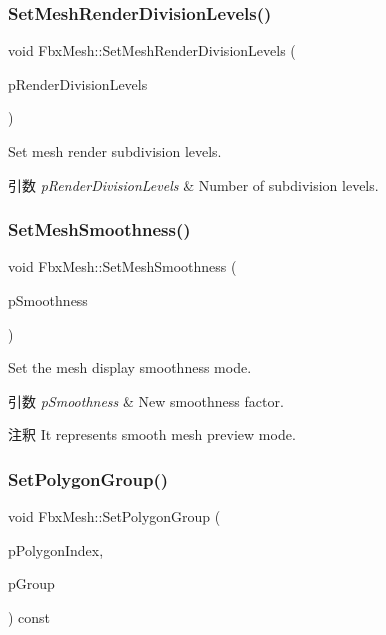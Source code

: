 \subsubsection{\texorpdfstring{Set\+Mesh\+Render\+Division\+Levels()}{SetMeshRenderDivisionLevels()}}
{\footnotesize\ttfamily void Fbx\+Mesh\+::\+Set\+Mesh\+Render\+Division\+Levels (\begin{DoxyParamCaption}\item[{int}]{p\+Render\+Division\+Levels }\end{DoxyParamCaption})}

Set mesh render subdivision levels. 
\begin{DoxyParams}{引数}
{\em p\+Render\+Division\+Levels} & Number of subdivision levels. \\
\hline
\end{DoxyParams}
\mbox{\label{class_fbx_mesh_ab07446f1c0dd0bae4597bb20a9d27265}} 
\subsubsection{\texorpdfstring{Set\+Mesh\+Smoothness()}{SetMeshSmoothness()}}
{\footnotesize\ttfamily void Fbx\+Mesh\+::\+Set\+Mesh\+Smoothness (\begin{DoxyParamCaption}\item[{\hyperlink{class_fbx_mesh_a7ac812140810290f718863c170279cf3}{Fbx\+Mesh\+::\+E\+Smoothness}}]{p\+Smoothness }\end{DoxyParamCaption})}

Set the mesh display smoothness mode. 
\begin{DoxyParams}{引数}
{\em p\+Smoothness} & New smoothness factor. \\
\hline
\end{DoxyParams}
\begin{DoxyRemark}{注釈}
It represents smooth mesh preview mode. 
\end{DoxyRemark}
\mbox{\label{class_fbx_mesh_ab7c7d2325c2afa2c7bd0099b9a0f24dc}} 
\subsubsection{\texorpdfstring{Set\+Polygon\+Group()}{SetPolygonGroup()}}
{\footnotesize\ttfamily void Fbx\+Mesh\+::\+Set\+Polygon\+Group (\begin{DoxyParamCaption}\item[{int}]{p\+Polygon\+Index,  }\item[{int}]{p\+Group }\end{DoxyParamCaption}) const\hspace{0.3cm}{\ttfamily [inline]}}

